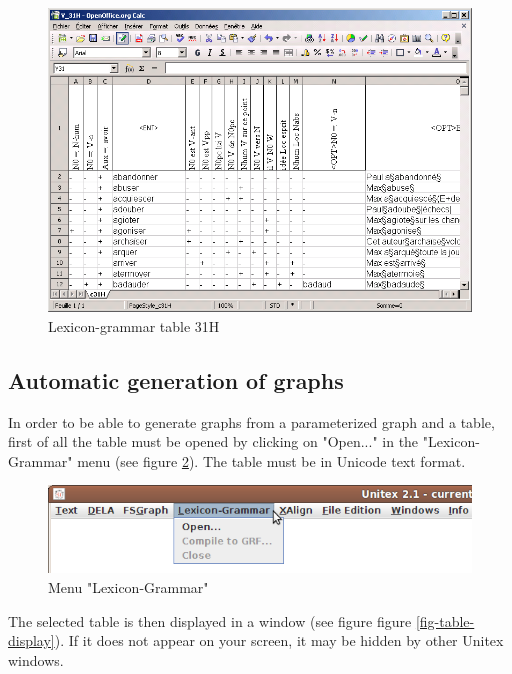 \begin{figure}[!h]
\begin{center}
\includegraphics[width=15cm]{resources/img/fig8-4.png}
\caption{Lexicon-grammar table 31H\label{fig-table-31H}}
\end{center}
\end{figure}


\subsection{Automatic generation of graphs}
In order to be able to generate graphs from a parameterized graph and a table,
first of all the table must be opened by clicking on "Open..." in the 
"Lexicon-Grammar" menu (see figure \ref{fig-lexicon-grammar-menu}). The table
must be in Unicode text format.

\begin{figure}[!h]
\begin{center}
\includegraphics[width=12cm]{resources/img/fig8-5.png}
\caption{Menu "Lexicon-Grammar"\label{fig-lexicon-grammar-menu}}
\end{center}
\end{figure}

\bigskip
\noindent The selected table is then displayed in a window (see figure figure
\ref{fig-table-display}). If it does not appear on your screen, it may be
hidden by other Unitex windows.

